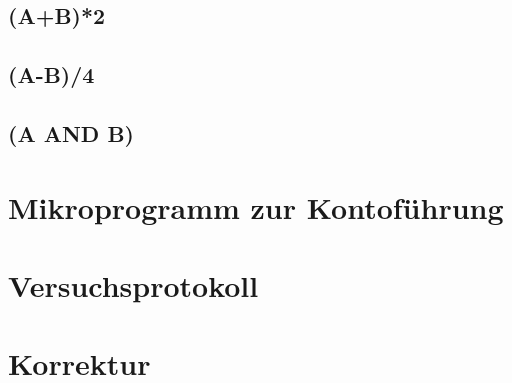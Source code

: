 \documentclass[paper=a4, fontsize=11pt]{scrartcl}
\numberwithin{equation}{section}
\numberwithin{figure}{section}
\numberwithin{table}{section}
\begin{document}

\subsection{(A+B)*2}


\subsection{(A-B)/4}


\subsection{(A AND B)}


\newpage

\section{Mikroprogramm zur Kontoführung}


\newpage

\section{Versuchsprotokoll}


\newpage

\section{Korrektur}
\end{document}
